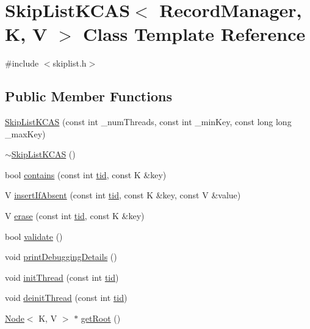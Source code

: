 \hypertarget{classSkipListKCAS}{}\section{Skip\+List\+K\+C\+AS$<$ Record\+Manager, K, V $>$ Class Template Reference}
\label{classSkipListKCAS}


{\ttfamily \#include $<$skiplist.\+h$>$}

\subsection*{Public Member Functions}
\begin{DoxyCompactItemize}
\item 
\hyperlink{classSkipListKCAS_ad888a514bdad0bcd7e66d420aa812dfd}{Skip\+List\+K\+C\+AS} (const int \+\_\+num\+Threads, const int \+\_\+min\+Key, const long long \+\_\+max\+Key)
\item 
\hyperlink{classSkipListKCAS_a300d303cd08e2eca1f1b26618976eaa7}{$\sim$\+Skip\+List\+K\+C\+AS} ()
\item 
bool \hyperlink{classSkipListKCAS_a4136ad0113f56f3b6027f19b8a0bb2e4}{contains} (const int \hyperlink{microbench_2main_8cpp_a9ca9869868fe7e7a38a921cc7de4103f}{tid}, const K \&key)
\item 
V \hyperlink{classSkipListKCAS_a31ac3cb003b2db554e9ff88709cf27b8}{insert\+If\+Absent} (const int \hyperlink{microbench_2main_8cpp_a9ca9869868fe7e7a38a921cc7de4103f}{tid}, const K \&key, const V \&value)
\item 
V \hyperlink{classSkipListKCAS_ad627fc3dae55d47033e23c7cb444361c}{erase} (const int \hyperlink{microbench_2main_8cpp_a9ca9869868fe7e7a38a921cc7de4103f}{tid}, const K \&key)
\item 
bool \hyperlink{classSkipListKCAS_a50180c470d3c81053dc6cfd0ce942815}{validate} ()
\item 
void \hyperlink{classSkipListKCAS_a4863afabbb70b137e69bf3aef5f53481}{print\+Debugging\+Details} ()
\item 
void \hyperlink{classSkipListKCAS_a5794714ba69feac4dc63c3962a55c585}{init\+Thread} (const int \hyperlink{microbench_2main_8cpp_a9ca9869868fe7e7a38a921cc7de4103f}{tid})
\item 
void \hyperlink{classSkipListKCAS_abd5d5cf784b1572397f8fbc23d700d4d}{deinit\+Thread} (const int \hyperlink{microbench_2main_8cpp_a9ca9869868fe7e7a38a921cc7de4103f}{tid})
\item 
\hyperlink{classNode}{Node}$<$ K, V $>$ $\ast$ \hyperlink{classSkipListKCAS_aba9dcac668a65d8716c74298c0499218}{get\+Root} ()
\end{DoxyCompactItemize}


